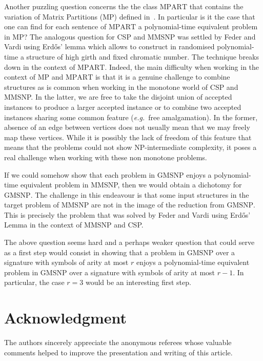 \documentclass[10pt,a4paper]{amsart}
\theoremstyle{plain}
\theoremstyle{definition}
\numberwithin{equation}{section}
\newcommand{\eg}{\emph{e.g.}\xspace}  %
\newcommand{\GMSNP}[0]{\textrm{GMSNP}}
\newcommand{\MPART}[0]{\ensuremath{\textrm{MPART}}}
\def\eg{{\em e.g.}}
\begin{document}
Another puzzling question concerns the the class $\MPART$ that contains the variation of Matrix Partitions (MP) defined in~\cite{barsukovkante}.
%
In particular is it the case that one can find for each sentence of $\MPART$ a polynomial-time equivalent problem in MP?
%
The analogous question for CSP and MMSNP was settled by Feder and Vardi using Erd\H{o}s' lemma which allows to construct in randomised polynomial-time a structure of high girth and fixed chromatic number. 
%
The technique breaks down in the context of $\MPART$.
%
Indeed, the main difficulty when working in the context of MP and $\MPART$ is that it is a genuine challenge to combine structures as is common when working in the monotone world of CSP and MMSNP. 
%
In the latter, we are free to take the disjoint union of accepted instances to produce a larger accepted instance or to combine two accepted instances sharing some common feature (\eg~free amalgamation). 
%
In the former, absence of an edge between vertices does not usually mean that we may freely map these vertices.
%
While it is possibly the lack of freedom of this feature that means that the problems could not show NP-intermediate complexity, it poses a real challenge when working with these non monotone problems.

If we could somehow show that each problem in  $\GMSNP$ enjoys a polynomial-time equivalent problem in MMSNP, then we would obtain a dichotomy for $\GMSNP$.
%
The challenge in this endeavour is that some input structures in the target problem of MMSNP are not in the image of the reduction from $\GMSNP$. 
%
This is precisely the problem that was solved by Feder and Vardi using Erd\H{o}s' Lemma in the context of MMSNP and CSP.  

The above question seems hard and a perhaps weaker question that could serve as a first step would consist in showing that a problem in $\GMSNP$ over a signature with symbols of arity at most $r$ enjoys a polynomial-time equivalent problem in $\GMSNP$ over a signature with symbols of arity at most $r-1$. 
%
In particular, the case $r=3$ would be an interesting first step. 



\section*{Acknowledgment}
  \noindent The authors sincerely appreciate the anonymous referees whose valuable comments helped to improve the presentation and writing of this article.
\end{document}
